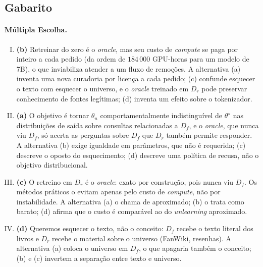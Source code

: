 \documentclass{dlproblemset}
\begin{document}
\begin{enumerate}[I)]
\end{enumerate}

\newpage
\subsection*{Gabarito}
\color{blue}

\paragraph{Múltipla Escolha.}
\begin{enumerate}[I)]
    \item \textbf{(b)} Retreinar do zero é o \textit{oracle}, mas seu custo de \textit{compute} se paga por inteiro a cada pedido (da ordem de $184\,000$ GPU-horas para um modelo de 7B), o que inviabiliza atender a um fluxo de remoções. A alternativa (a) inventa uma nova curadoria por licença a cada pedido; (c) confunde esquecer o texto com esquecer o universo, e o \textit{oracle} treinado em $D_r$ pode preservar conhecimento de fontes legítimas; (d) inventa um efeito sobre o tokenizador.

    \item \textbf{(a)} O objetivo é tornar $\theta_u$ comportamentalmente indistinguível de $\theta^\star$ nas distribuições de saída sobre consultas relacionadas a $D_f$, e o \textit{oracle}, que nunca viu $D_f$, só acerta as perguntas sobre $D_f$ que $D_r$ também permite responder. A alternativa (b) exige igualdade em parâmetros, que não é requerida; (c) descreve o oposto do esquecimento; (d) descreve uma política de recusa, não o objetivo distribucional.

    \item \textbf{(c)} O retreino em $D_r$ é o \textit{oracle}: exato por construção, pois nunca viu $D_f$. Os métodos práticos o evitam apenas pelo custo de \textit{compute}, não por instabilidade. A alternativa (a) o chama de aproximado; (b) o trata como barato; (d) afirma que o custo é comparável ao do \textit{unlearning} aproximado.

    \item \textbf{(d)} Queremos esquecer o texto, não o conceito: $D_f$ recebe o texto literal dos livros e $D_r$ recebe o material sobre o universo (FanWiki, resenhas). A alternativa (a) coloca o universo em $D_f$, o que apagaria também o conceito; (b) e (c) invertem a separação entre texto e universo.


\end{enumerate}
\end{document}
